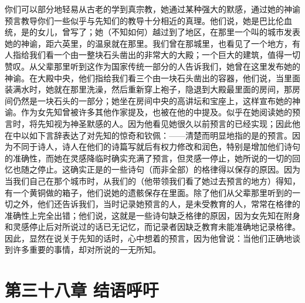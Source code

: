 你们可以部分地轻易从古老的学到真宗教，她通过某种强大的默感，通过她的神谕预言教导你们一些似乎与先知们的教导十分相近的真理。他们说，她是巴比伦血统，是的女儿，曾写了；她（不知如何）越过到了地区，在那里一个叫的城市发表她的神谕，距六英里，的温泉就在那里。我们曾在那城里，也看见了一个地方，有人指给我们看一个由一整块石头凿出的非常大的大殿；一个巨大的建筑，值得一切赞叹。从父辈那里听到这作为国家传统一部分的人告诉我们，她曾在这里发布她的神谕。在大殿中央，他们指给我们看三个由一块石头凿出的容器，他们说，当里面装满水时，她就在那里洗澡，然后重新穿上袍子，隐退到大殿最里面的房间，那房间仍然是一块石头的一部分；她坐在房间中央的高讲坛和宝座上，这样宣布她的神谕。作为女先知曾被许多其他作家提及，也被在他的中提及。似乎在她阅读她的预言时，将先知视为神圣默感的人。因为他看见她很久以前预言的已经实现；因此他在中以如下言辞表达了对先知的惊奇和钦佩：——清楚而明显地指的是的预言。因为不同于诗人，诗人在他们的诗篇写就后有权力修改和润色，特别是增加他们诗句的准确性，而她在灵感降临时确实充满了预言，但灵感一停止，她所说的一切的回忆也随之停止。这确实正是的一些诗句（而非全部）的格律得以保存的原因。因为当我们自己在那个城市时，从我们的（他带领我们看了她过去预言的地方）得知，有一个黄铜做的箱子，他们说她的遗骸保存在里面。除了他们从父辈那里听到的一切之外，他们还告诉我们，当时记录她预言的人，是未受教育的人，常常在格律的准确性上完全出错；他们说，这就是一些诗句缺乏格律的原因，因为女先知在附身和灵感停止后对所说过的话已无记忆，而记录者因缺乏教育未能准确地记录格律。因此，显然在说关于先知的话时，心中想着的预言，因为他曾说：当他们正确地谈到许多重要的事情，却对所说的一无所知。\par


\section{第三十八章 结语呼吁}


